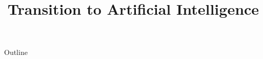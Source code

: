 \documentclass[xcolor=dvipsnames,compress,t,pdf,9pt]{beamer}
\title[\insertframenumber /\inserttotalframenumber]{Transition to Artificial Intelligence}
\begin{document}
	\begin{frame}
	\titlepage
	\end{frame}

	\begin{frame}{Outline}
	    \tableofcontents
	\end{frame}

	
	
\end{document}
